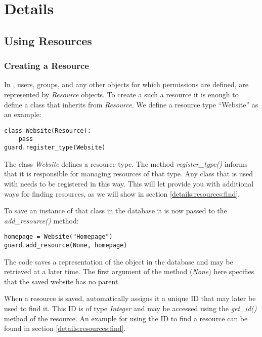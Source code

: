 \newpage
\section{Details}

\subsection{Using Resources}
\subsubsection{\label{details:resources:add}Creating a Resource}

In \product, users, groups, and any other objects for which permissions 
are defined, are represented by {\it Resource} objects.
To create a such a resource it is enough to define a class that inherits 
from {\it Resource}. We define a resource type ``Website'' as an example:

\begin{lstlisting}
class Website(Resource):
    pass
guard.register_type(Website)
\end{lstlisting}

The class {\it Website} defines a resource type.
The method {\it register\_type()} informs \product that it is responsible 
for managing resources of that type. Any class that is used with \product 
needs to be registered in this way. This will let \product provide you with 
additional ways for finding resources, as we will show in section 
\ref{details:resources:find}.

To save an instance of that class in the database it is now passed to the 
{\it add\_resource()} method:

\begin{lstlisting}
homepage = Website("Homepage")
guard.add_resource(None, homepage)
\end{lstlisting}

The code saves a representation of the object in the database and may be 
retrieved at a later time. The first argument of the method ({\it None}) 
here specifies that the saved website has no parent.

When a resource is saved, \product automatically assigns it a unique ID 
that may later be used to find it. This ID is of type {\it Integer} and 
may be accessed using the {\it get\_id()} method of the resource. An example 
for using the ID to find a resource can be found in section 
\ref{details:resources:find}.

